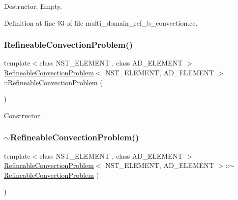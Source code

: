 Destructor. Empty. 



Definition at line 93 of file multi\+\_\+domain\+\_\+ref\+\_\+b\+\_\+convection.\+cc.

\mbox{\label{classRefineableConvectionProblem_aa3a0c85ea1db9186292d130a3ec23a2d}} 
\subsubsection{\texorpdfstring{Refineable\+Convection\+Problem()}{RefineableConvectionProblem()}\hspace{0.1cm}{\footnotesize\ttfamily [2/2]}}
{\footnotesize\ttfamily template$<$class N\+S\+T\+\_\+\+E\+L\+E\+M\+E\+NT , class A\+D\+\_\+\+E\+L\+E\+M\+E\+NT $>$ \\
\hyperlink{classRefineableConvectionProblem}{Refineable\+Convection\+Problem}$<$ N\+S\+T\+\_\+\+E\+L\+E\+M\+E\+NT, A\+D\+\_\+\+E\+L\+E\+M\+E\+NT $>$\+::\hyperlink{classRefineableConvectionProblem}{Refineable\+Convection\+Problem} (\begin{DoxyParamCaption}{ }\end{DoxyParamCaption})}



Constructor. 

\mbox{\label{classRefineableConvectionProblem_a43fc2693230601928578d5b0c6380943}} 
\subsubsection{\texorpdfstring{$\sim$\+Refineable\+Convection\+Problem()}{~RefineableConvectionProblem()}\hspace{0.1cm}{\footnotesize\ttfamily [2/2]}}
{\footnotesize\ttfamily template$<$class N\+S\+T\+\_\+\+E\+L\+E\+M\+E\+NT , class A\+D\+\_\+\+E\+L\+E\+M\+E\+NT $>$ \\
\hyperlink{classRefineableConvectionProblem}{Refineable\+Convection\+Problem}$<$ N\+S\+T\+\_\+\+E\+L\+E\+M\+E\+NT, A\+D\+\_\+\+E\+L\+E\+M\+E\+NT $>$\+::$\sim$\hyperlink{classRefineableConvectionProblem}{Refineable\+Convection\+Problem} (\begin{DoxyParamCaption}{ }\end{DoxyParamCaption})\hspace{0.3cm}{\ttfamily [inline]}}



